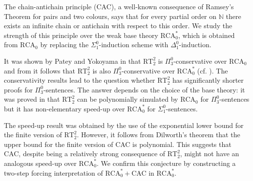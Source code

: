\documentclass[bsl,meeting]{asl}
\newcommand{\NP}{}
\begin{document}
\thispagestyle{empty}


\NP  
{}


The chain-antichain principle (CAC), a well-known consequence of Ramsey's Theorem for pairs and two colours, says that for every partial order on $\mathbb{N}$ there exists an infinite chain or antichain with respect to this order. We study the strength of this principle over the weak base theory $\mathrm{RCA}_0^*$, which is obtained from $\mathrm{RCA}_0$ by replacing the $\Sigma^0_1$-induction scheme with $\Delta^0_1$-induction. %

It was shown by Patey and Yokoyama in \cite{py} that $\mathrm{RT}_2^2$ is $\Pi^0_3$-conservative over $\mathrm{RCA}_0$ and from \cite{yokoyama} it follows that $\mathrm{RT}_2^2$ is also $\Pi^0_3$-conservative over $\mathrm{RCA}^*_0$ (cf. \cite{kky}). 
The conservativity results lead to the question whether $\mathrm{RT}_2^2$ has significantly shorter proofs for $\Pi^0_3$-sentences. The answer depends on the choice of the base theory: it was proved in \cite{pfsize} that $\mathrm{RT}_2^2$ can be polynomially simulated by $\mathrm{RCA}_0$ for $\Pi^0_3$-sentences but it has non-elementary speed-up over $\mathrm{RCA}^*_0$ for $\Sigma^0_1$-sentences.

The speed-up result was obtained by the use of the exponential lower bound for the finite version of $\mathrm{RT}_2^2$. However, it follows from Dilworth's theorem that the upper bound for the finite version of CAC is polynomial. This suggests that CAC, 
despite being a relatively strong consequence of $\mathrm{RT}_2^2$, might not have an analogous speed-up over $\mathrm{RCA}^*_0$. We confirm this conjecture by constructing a two-step forcing interpretation of $\mathrm{RCA}^*_0+$CAC in $\mathrm{RCA}^*_0$. 
\end{document}
